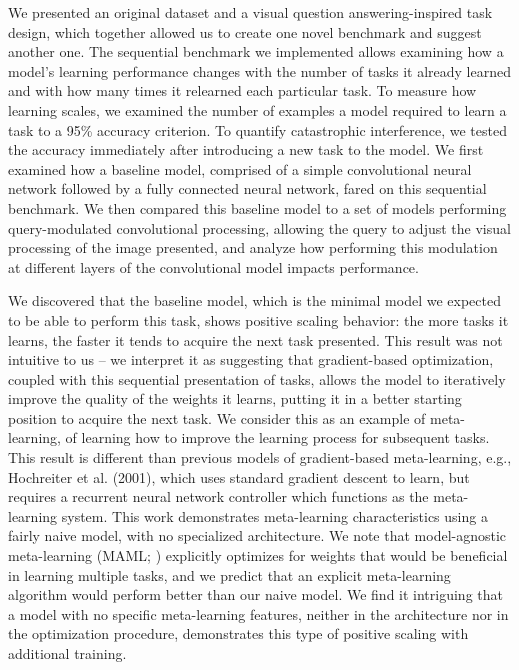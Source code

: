 We presented an original dataset and a visual question answering-inspired task design, which together allowed us to create one novel benchmark and suggest another one. The sequential benchmark we implemented allows examining how a model’s learning performance changes with the number of tasks it already learned and with how many times it relearned each particular task. To measure how learning scales, we examined the number of examples a model required to learn a task to a 95\% accuracy criterion. To quantify catastrophic interference, we tested the accuracy immediately after introducing a new task to the model. We first examined how a baseline model, comprised of a simple convolutional neural network followed by a fully connected neural network, fared on this sequential benchmark. We then compared this baseline model to a set of models performing query-modulated convolutional processing, allowing the query to adjust the visual processing of the image presented, and analyze how performing this modulation at different layers of the convolutional model impacts performance.

We discovered that the baseline model, which is the minimal model we expected to be able to perform this task, shows positive scaling behavior: the more tasks it learns, the faster it tends to acquire the next task presented. This result was not intuitive to us -- we interpret it as suggesting that gradient-based optimization, coupled with this sequential presentation of tasks, allows the model to iteratively improve the quality of the weights it learns, putting it in a better starting position to acquire the next task. We consider this as an example of meta-learning, of learning how to improve the learning process for subsequent tasks. This result is different than previous models of gradient-based meta-learning, e.g., Hochreiter et al. (2001), which uses standard gradient descent to learn, but requires a recurrent neural network controller which functions as the meta-learning system. This work demonstrates meta-learning characteristics using a fairly naive model, with no specialized architecture. We note that model-agnostic meta-learning (MAML; \cite{Finn2017}) explicitly optimizes for weights that would be beneficial in learning multiple tasks, and we predict that an explicit meta-learning algorithm would perform better than our naive model. We find it intriguing that a model with no specific meta-learning features, neither in the architecture nor in the optimization procedure, demonstrates this type of positive scaling with additional training.

